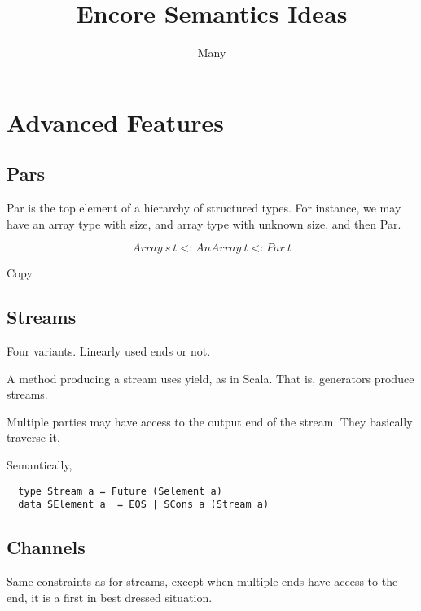 \documentclass{article}
\title{Encore Semantics Ideas}
\author{Many}
\newcommand{\sub}{\mathop{<:}}
\begin{document}
	\maketitle
	

	\section{Advanced Features}

	\subsection*{Pars}


	Par is the top element of a hierarchy of structured types.
	For instance, we may have an array type with size, and array
	type with unknown size, and then Par.

	\[
		Array~s~t \sub AnArray~t \sub Par~t
	\]

Copy

\subsection*{Streams}


Four variants. Linearly used ends or not.

A method producing a stream uses yield, as in Scala. 
That is, generators produce streams.

Multiple parties may have access to the output end of the stream.
They basically traverse it.

Semantically,
\begin{verbatim}
  type Stream a = Future (Selement a)
  data SElement a  = EOS | SCons a (Stream a) 
\end{verbatim}

\subsection*{Channels}

Same constraints as for streams, except when multiple ends have access
to the end, it is a first in best dressed situation.		



	
\end{document}
